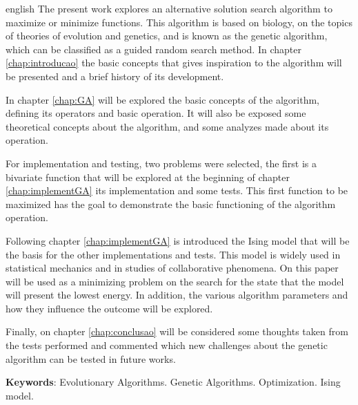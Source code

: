 \documentclass[
	12pt,				%
	openright,			%
	twoside,			%
	a4paper,			%
	english,			%
	brazil				%
	]{abntex2}
\newcommand{\listofquadrosname}{Lista de quadros}
\begin{document}
\begin{resumo}[Abstract]
 \begin{otherlanguage*}{english}
   The present work explores an alternative solution search algorithm to maximize or minimize functions. This algorithm is based on biology, on the topics of theories of evolution and genetics, and is known as the genetic algorithm, which can be classified as a guided random search method. In chapter \ref{chap:introducao} the basic concepts that gives inspiration to the algorithm will be presented and a brief history of its development.
   
   In chapter \ref{chap:GA} will be explored the basic concepts of the algorithm, defining its operators and basic operation. It will also be exposed some theoretical concepts about the algorithm, and some analyzes made about its operation.
   
   For implementation and testing, two problems were selected, the first is a bivariate function that will be explored at the beginning of chapter \ref{chap:implementGA} its implementation and some tests. This first function to be maximized has the goal to demonstrate the basic functioning of the algorithm operation.
   
   Following chapter \ref{chap:implementGA} is introduced the Ising model that will be the basis for the other implementations and tests. This model is widely used in statistical mechanics and in studies of collaborative phenomena. On this paper will be used as a minimizing problem on the search for the state that the model will present the lowest energy. In addition, the various algorithm parameters and how they influence the outcome will be explored.
   
   Finally, on chapter \ref{chap:conclusao} will be considered some thoughts taken from the tests performed and commented which new challenges about the genetic algorithm can be tested in future works.

   \vspace{\onelineskip}
 
   \noindent 
   \textbf{Keywords}: Evolutionary Algorithms. Genetic Algorithms. Optimization. Ising model.
 \end{otherlanguage*}
\end{resumo}


\listoffigures*
\cleardoublepage

\end{document}
